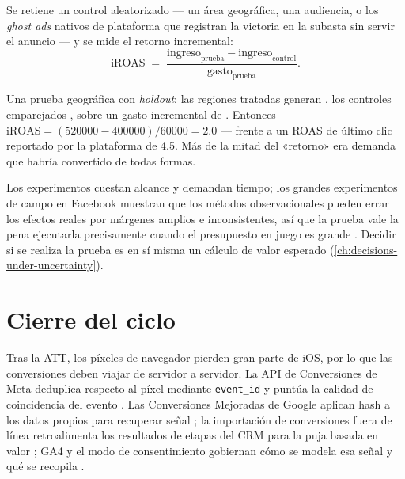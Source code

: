 Se retiene un control aleatorizado --- un área geográfica, una audiencia, o los \emph{ghost ads} nativos de plataforma que registran la victoria en la subasta sin servir el anuncio \parencite{johnson2017ghost} --- y se mide el retorno incremental:
\begin{equation}\label{eq:iroas}
  \mathrm{iROAS} \;=\; \frac{\text{ingreso}_\text{prueba}-\text{ingreso}_\text{control}}{\text{gasto}_\text{prueba}} .
\end{equation}

\begin{example}
Una prueba geográfica con \emph{holdout}: las regiones tratadas generan , los controles emparejados , sobre un gasto incremental de . Entonces $\mathrm{iROAS}=(520000-400000)/60000=\num{2.0}$ --- frente a un ROAS de último clic reportado por la plataforma de \num{4.5}. Más de la mitad del «retorno» era demanda que habría convertido de todas formas.
\end{example}

Los experimentos cuestan alcance y demandan tiempo; los grandes experimentos de campo en Facebook muestran que los métodos observacionales pueden errar los efectos reales por márgenes amplios e inconsistentes, así que la prueba vale la pena ejecutarla precisamente cuando el presupuesto en juego es grande \parencite{gordon2019comparison}. Decidir si se realiza la prueba es en sí misma un cálculo de valor esperado (\cref{ch:decisions-under-uncertainty}).

\section{Cierre del ciclo}\label{sec:closing-loop}

Tras la ATT, los píxeles de navegador pierden gran parte de iOS, por lo que las conversiones deben viajar de servidor a servidor. La API de Conversiones de Meta deduplica respecto al píxel mediante \texttt{event\_id} y puntúa la calidad de coincidencia del evento \parencite{metadev-deduplicate-pixel-and-se,metadev-verifying-setup}. Las Conversiones Mejoradas de Google aplican hash a los datos propios para recuperar señal \parencite{gads9888656,gads13258081}; la importación de conversiones fuera de línea retroalimenta los resultados de etapas del CRM para la puja basada en valor \parencite{gads2998031,gdev-upload-offline}; GA4 y el modo de consentimiento gobiernan cómo se modela esa señal y qué se recopila \parencite{ga10597962,gads13695607}.

